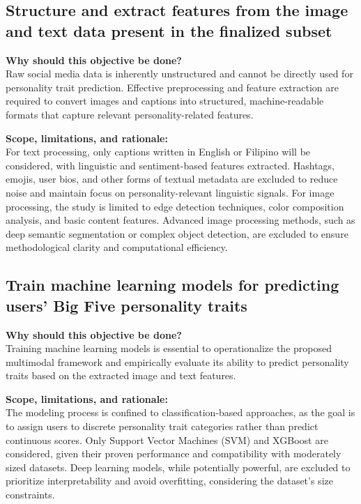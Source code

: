	\subsection{Structure and extract features from the image and text data present in the finalized subset}
	
	\textbf{Why should this objective be done?} \\
	Raw social media data is inherently unstructured and cannot be directly used for personality trait prediction. Effective preprocessing and feature extraction are required to convert images and captions into structured, machine-readable formats that capture relevant personality-related features.
	
	\textbf{Scope, limitations, and rationale:} \\
	For text processing, only captions written in English or Filipino will be considered, with linguistic and sentiment-based features extracted. Hashtags, emojis, user bios, and other forms of textual metadata are excluded to reduce noise and maintain focus on personality-relevant linguistic signals. For image processing, the study is limited to edge detection techniques, color composition analysis, and basic content features. Advanced image processing methods, such as deep semantic segmentation or complex object detection, are excluded to ensure methodological clarity and computational efficiency.
	
	\subsection{Train machine learning models for predicting users' Big Five personality traits}
	
	\textbf{Why should this objective be done?} \\
	Training machine learning models is essential to operationalize the proposed multimodal framework and empirically evaluate its ability to predict personality traits based on the extracted image and text features.
	
	\textbf{Scope, limitations, and rationale:} \\
	The modeling process is confined to classification-based approaches, as the goal is to assign users to discrete personality trait categories rather than predict continuous scores. Only Support Vector Machines (SVM) and XGBoost are considered, given their proven performance and compatibility with moderately sized datasets. Deep learning models, while potentially powerful, are excluded to prioritize interpretability and avoid overfitting, considering the dataset's size constraints.
	
